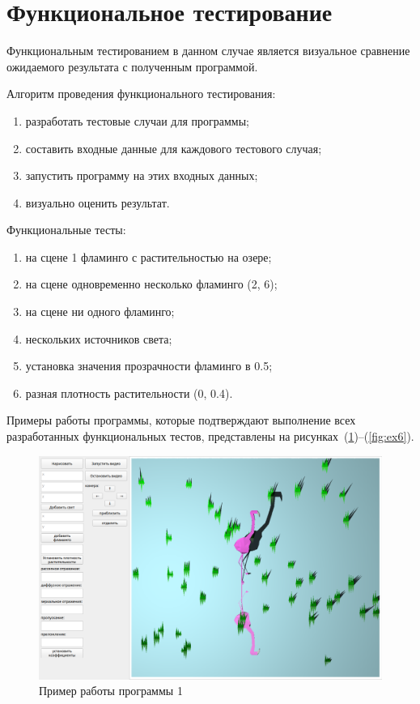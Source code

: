 \section{Функциональное тестирование}

Функциональным тестированием в данном случае является визуальное сравнение ожидаемого результата с полученным программой.

Алгоритм проведения функционального тестирования:
\begin{enumerate}[label=\arabic*)]
	\item разработать тестовые случаи для программы;
	\item составить входные данные для каждового тестового случая;
	\item запустить программу на этих входных данных;
	\item визуально оценить результат.
\end{enumerate}

Функциональные тесты:
\begin{enumerate}[label=\arabic*)]
	\item на сцене 1 фламинго с растительностью на озере;
	\item на сцене одновременно несколько фламинго (2, 6);
	\item на сцене ни одного фламинго;
	\item нескольких источников света;
	\item установка значения прозрачности фламинго в 0.5;
	\item разная плотность растительности (0, 0.4).
\end{enumerate}

Примеры работы программы, которые подтверждают выполнение всех разработанных функциональных тестов, представлены на рисунках~(\ref{fig:ex1})--(\ref{fig:ex6}).

\begin{figure}[h!]
	\centering
	\includegraphics[width=0.8\linewidth]{img/ex1}
	\caption{Пример работы программы 1}
	\label{fig:ex1}
\end{figure}

